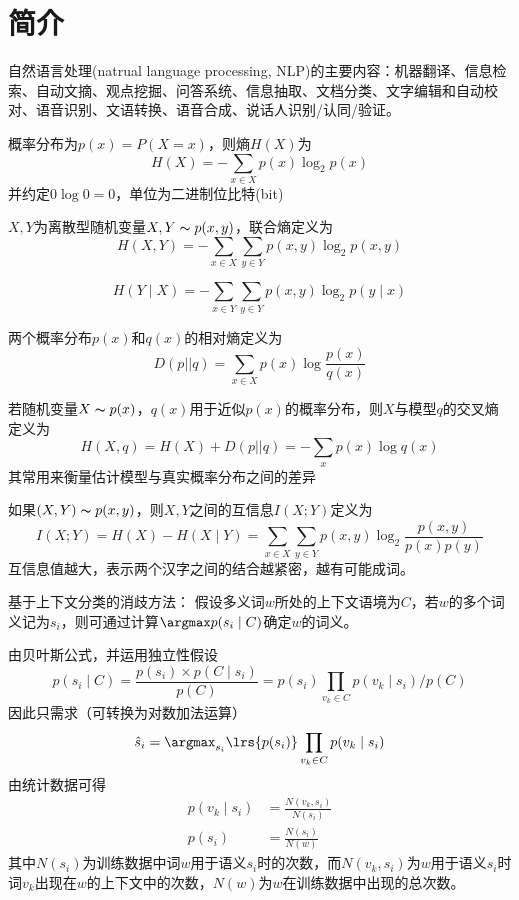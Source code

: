 
\section{简介}
自然语言处理(natrual language processing, NLP)的主要内容：机器翻译、信息检索、自动文摘、观点挖掘、问答系统、信息抽取、文档分类、文字编辑和自动校对、语音识别、文语转换、语音合成、说话人识别/认同/验证。

\begin{definition}[熵]
概率分布为$p(x)=P(X=x)$，则熵$H(X)$为
\[H(X)=-\sum_{x\in X}p(x)\log_2p(x)\]
并约定$0\log 0=0$，单位为二进制位比特(bit)
\end{definition}
\begin{definition}[联合熵]
$X,Y$为离散型随机变量$X,Y\thicksim p(x,y)$，联合熵定义为
\[H(X,Y)=-\sum_{x\in X}\sum_{y\in Y}p(x,y)\log_2 p(x,y)\]
\end{definition}
\begin{definition}[条件熵]
\[H(Y\mid X)=-\sum_{x\in Y}\sum_{y\in Y}p(x,y)\log_2 p(y\mid x)\]
\end{definition}
\begin{definition}
两个概率分布$p(x)$和$q(x)$的相对熵定义为
\[D(p||q)=\sum_{x\in X}p(x)\log\frac{p(x)}{q(x)}\]
\end{definition}
\begin{definition}[交叉熵]
若随机变量$X\thicksim p(x)$，$q(x)$用于近似$p(x)$的概率分布，则$X$与模型$q$的交叉熵定义为
\[H(X,q)=H(X)+D(p||q)=-\sum_x p(x)\log q(x)\]
其常用来衡量估计模型与真实概率分布之间的差异
\end{definition}
\begin{definition}[互信息]
如果$(X,Y)\thicksim p(x,y)$，则$X,Y$之间的互信息$I(X;Y)$定义为
\[I(X;Y)=H(X)-H(X\mid Y)=\sum_{x\in X}\sum_{y\in Y}p(x,y)\log_2\frac{p(x,y)}{p(x)p(y)}\]
互信息值越大，表示两个汉字之间的结合越紧密，越有可能成词。
\end{definition}

基于上下文分类的消歧方法：
假设多义词$w$所处的上下文语境为$C$，若$w$的多个词义记为$s_i$，则可通过计算$\argmax p(s_i\mid C)$确定$w$的词义。

由贝叶斯公式，并运用独立性假设
\[p(s_i\mid C)=\frac{p(s_i)\times p(C\mid s_i)}{p(C)}=p(s_i)\prod_{v_k\in C}p(v_k\mid s_i)\Big/ p(C)\]
因此只需求（可转换为对数加法运算）
\[\hat{s}_i=\argmax_{s_i}\lrs{p(s_i)}\prod_{v_k\in C}p(v_k\mid s_i)\]
由统计数据可得
\[\begin{aligned}
p(v_k\mid s_i)&=\frac{N(v_k,s_i)}{N(s_i)}\\
p(s_i)&=\frac{N(s_i)}{N(w)}
\end{aligned}\]
其中$N(s_i)$为训练数据中词$w$用于语义$s_i$时的次数，而$N(v_k,s_i)$为$w$用于语义$s_i$时词$v_k$出现在$w$的上下文中的次数，$N(w)$为$w$在训练数据中出现的总次数。